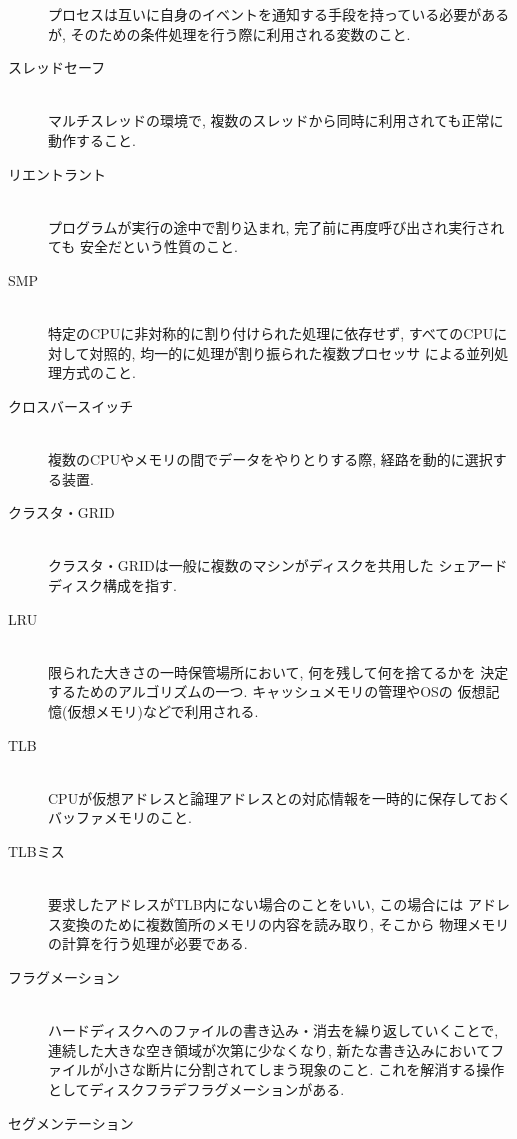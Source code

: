 \documentclass[a4paper, twocolumn]{jarticle}
\begin{document}
\begin{description}
    プロセスは互いに自身のイベントを通知する手段を持っている必要があるが, 
    そのための条件処理を行う際に利用される変数のこと.
    \cite{ref:condition-variables}
  \item[スレッドセーフ] \mbox{ }\\
    マルチスレッドの環境で, 複数のスレッドから同時に利用されても正常に
    動作すること. \cite{ref:thread-safe}
  \item[リエントラント] \mbox{ }\\
    プログラムが実行の途中で割り込まれ, 完了前に再度呼び出され実行されても
    安全だという性質のこと. \cite{ref:reentrant}
  \item[SMP] \mbox{ }\\
    特定のCPUに非対称的に割り付けられた処理に依存せず, 
    すべてのCPUに対して対照的, 均一的に処理が割り振られた複数プロセッサ
    による並列処理方式のこと. \cite{ref:smp}
  \item[クロスバースイッチ] \mbox{ }\\
    複数のCPUやメモリの間でデータをやりとりする際, 
    経路を動的に選択する装置. \cite{ref:crossbar}
  \item[クラスタ・GRID] \mbox{ }\\
    クラスタ・GRIDは一般に複数のマシンがディスクを共用した
    シェアードディスク構成を指す. \cite{ref:cluster}
  \item[LRU] \mbox{ }\\
    限られた大きさの一時保管場所において, 何を残して何を捨てるかを
    決定するためのアルゴリズムの一つ. キャッシュメモリの管理やOSの
    仮想記憶(仮想メモリ)などで利用される. \cite{ref:lru}
  \item[TLB] \mbox{ }\\
    CPUが仮想アドレスと論理アドレスとの対応情報を一時的に保存しておく
    バッファメモリのこと. \cite{ref:tlb}
  \item[TLBミス] \mbox{ }\\
    要求したアドレスがTLB内にない場合のことをいい, この場合には
    アドレス変換のために複数箇所のメモリの内容を読み取り, そこから
    物理メモリの計算を行う処理が必要である. \cite{ref:tlb-wiki}
  \item[フラグメーション] \mbox{ }\\
    ハードディスクへのファイルの書き込み・消去を繰り返していくことで, 
    連続した大きな空き領域が次第に少なくなり, 
    新たな書き込みにおいてファイルが小さな断片に分割されてしまう現象のこと. 
    これを解消する操作としてディスクフラデフラグメーションがある. 
    \cite{ref:fragmation}
  \item[セグメンテーション] \mbox{ }\\

\end{description}
\end{document}
